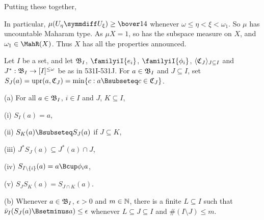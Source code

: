 {\noindent Putting these together,


In particular, $\mu(U_{\eta}\symmdiff U_{\xi})\ge\bover14$ whenever
$\omega\le\eta<\xi<\omega_1$.
So $\mu$ has uncountable Maharam type.   As $\mu X=1$, so has the
subspace measure on $X$, and $\omega_1\in\MahR(X)$.   Thus $X$ has all
the properties announced.
}%

 Let $I$ be a set, and let
$\frak B_{I}$, $\familyiI{e_i}$,
$\familyiI{\phi_i}$,
$\langle\frak C_J\rangle_{J\subseteq I}$ and
$J^*:\frak B_{I}\to[I]^{\le\omega}$ be as in 531I-531J.   For
$a\in\frak B_{I}$ and $J\subseteq I$, set
$S_J(a)=\upr(a,\frak C_J)=\min\{c:a\Bsubseteq c\in\frak C_J\}$.

(a) For all $a\in\frak B_{I}$, $i\in I$ and $J$,
$K\subseteq I$,

\quad(i) $S_{I}(a)=a$,

\quad(ii) $S_K(a)\Bsubseteq S_J(a)$ if $J\subseteq K$,

\quad(iii) $J^*S_J(a)\subseteq J^*(a)\cap J$,

\quad(iv) $S_{I\setminus\{i\}}(a)=a\Bcup\phi_ia$,

\quad(v) $S_JS_K(a)=S_{J\cap K}(a)$.

(b) Whenever $a\in\frak B_{I}$, $\epsilon>0$ and $m\in\Bbb N$,
there is a finite $L\subseteq I$ such that
$\bar\nu_{I}(S_J(a)\Bsetminus a)\le\epsilon$ whenever
$L\subseteq J\subseteq I$ and $\#(I\setminus J)\le m$.

